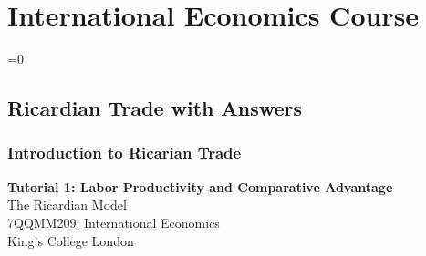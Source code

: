 \documentclass{beamer}
\newcommand{\showanswers}{1}  %
\begin{document}
\section{International Economics Course}

\ifnum\showanswers=0
\subsection{Ricardian Trade with Answers}

\subsubsection{Introduction to Ricarian Trade}


\begin{frame}

\vspace{1.5cm}

\centering
{\Large \textbf{Tutorial 1: Labor Productivity and Comparative Advantage}} \\[0.5cm]
{\large The Ricardian Model} \\[1.0cm]

{\small 7QQMM209: International Economics} \\[0.3cm]
{\small King's College London}

\vfill

\end{frame}
\end{document}
